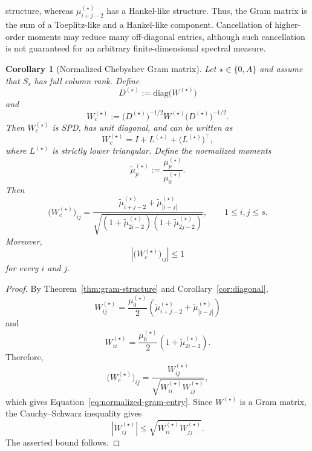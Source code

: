 \documentclass[pdflatex,sn-mathphys-num]{sn-jnl}%
\newtheorem{corollary}{Corollary}
\begin{document}
structure, whereas $\mu_{i+j-2}^{(\star)}$ has a Hankel-like
structure. Thus, the Gram matrix is the sum of a Toeplitz-like and a
Hankel-like component. Cancellation of higher-order moments may
reduce many off-diagonal entries, although such cancellation is not
guaranteed for an arbitrary finite-dimensional spectral measure.
\begin{corollary}[Normalized Chebyshev Gram matrix]
\label{cor:structurecheby}
Let $\star\in\{0,A\}$ and assume that $S_{s}$ has full column rank.
Define
\[
D^{(\star)}
:=
\mathrm{diag}\bigl(W^{(\star)}\bigr)
\]
and
\[
W_c^{(\star)}
:=
\bigl(D^{(\star)}\bigr)^{-1/2}
W^{(\star)}
\bigl(D^{(\star)}\bigr)^{-1/2}.
\]
Then $W_c^{(\star)}$ is SPD, has unit diagonal, and can be written as
\[
W_c^{(\star)}
=
I+L^{(\star)}+\bigl(L^{(\star)}\bigr)^\top,
\]
where $L^{(\star)}$ is strictly lower triangular.
Define the normalized moments
\[
\widetilde{\mu}_p^{(\star)}
:=
\frac{\mu_p^{(\star)}}{\mu_0^{(\star)}}.
\]
Then
\begin{equation}
\label{eq:normalized-gram-entry}
\bigl(W_c^{(\star)}\bigr)_{ij}
=
\frac{
\widetilde{\mu}_{i+j-2}^{(\star)}
+
\widetilde{\mu}_{|i-j|}^{(\star)}
}{
\sqrt{
\left(
1+\widetilde{\mu}_{2i-2}^{(\star)}
\right)
\left(
1+\widetilde{\mu}_{2j-2}^{(\star)}
\right)
}
},
\qquad
1\leq i,j\leq s.
\end{equation}
Moreover,
\[
\left|
\bigl(W_c^{(\star)}\bigr)_{ij}
\right|
\leq1
\]
for every $i$ and $j$.
\end{corollary}
\begin{proof}
By Theorem~\ref{thm:gram-structure} and
Corollary~\ref{cor:diagonal},
\[
W^{(\star)}_{ij}
=
\frac{\mu_0^{(\star)}}{2}
\left(
\widetilde{\mu}_{i+j-2}^{(\star)}
+
\widetilde{\mu}_{|i-j|}^{(\star)}
\right)
\]
and
\[
W^{(\star)}_{ii}
=
\frac{\mu_0^{(\star)}}{2}
\left(
1+\widetilde{\mu}_{2i-2}^{(\star)}
\right).
\]
Therefore,
\[
\bigl(W_c^{(\star)}\bigr)_{ij}
=
\frac{
W^{(\star)}_{ij}
}{
\sqrt{
W^{(\star)}_{ii}W^{(\star)}_{jj}
}
},
\]
which gives Equation~\eqref{eq:normalized-gram-entry}. Since
$W^{(\star)}$ is a Gram matrix, the Cauchy--Schwarz inequality gives
\[
\left|W^{(\star)}_{ij}\right|
\leq
\sqrt{
W^{(\star)}_{ii}W^{(\star)}_{jj}
}.
\]
The asserted bound follows.
\end{proof}
\end{document}
